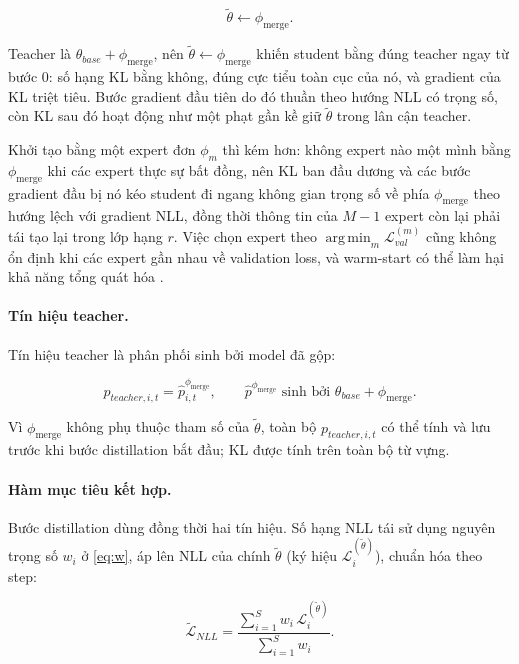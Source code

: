 \documentclass[12pt,a4paper]{article}
\DeclareMathOperator*{\argmin}{arg\,min}
\newcommand{\pmerge}{\phi_{\mathrm{merge}}}
\begin{document}
\begin{equation}
\label{eq:studentinit}
\tilde\theta \leftarrow \pmerge.
\end{equation}

Teacher là $\theta_{base}+\pmerge$, nên $\tilde\theta \leftarrow \pmerge$ khiến student bằng đúng teacher ngay từ bước $0$: số hạng KL bằng không, đúng cực tiểu toàn cục của nó, và gradient của KL triệt tiêu. Bước gradient đầu tiên do đó thuần theo hướng NLL có trọng số, còn KL sau đó hoạt động như một phạt gần kề giữ $\tilde\theta$ trong lân cận teacher.

Khởi tạo bằng một expert đơn $\phi_m$ thì kém hơn: không expert nào một mình bằng $\pmerge$ khi các expert thực sự bất đồng, nên KL ban đầu dương và các bước gradient đầu bị nó kéo student đi ngang không gian trọng số về phía $\pmerge$ theo hướng lệch với gradient NLL, đồng thời thông tin của $M-1$ expert còn lại phải tái tạo lại trong lớp hạng $r$. Việc chọn expert theo $\argmin_m \mathcal{L}_{val}^{(m)}$ cũng không ổn định khi các expert gần nhau về validation loss, và warm-start có thể làm hại khả năng tổng quát hóa \cite{ash2020warmstarting}.

\paragraph{Tín hiệu teacher.}
Tín hiệu teacher là phân phối sinh bởi model đã gộp:

\begin{equation}
\label{eq:pteacher}
p_{teacher,i,t} = \hat{p}_{i,t}^{\pmerge}, \qquad \hat{p}^{\pmerge} \text{ sinh bởi } \theta_{base} + \pmerge.
\end{equation}

Vì $\pmerge$ không phụ thuộc tham số của $\tilde\theta$, toàn bộ $p_{teacher,i,t}$ có thể tính và lưu trước khi bước distillation bắt đầu; KL được tính trên toàn bộ từ vựng.

\paragraph{Hàm mục tiêu kết hợp.}
Bước distillation dùng đồng thời hai tín hiệu. Số hạng NLL tái sử dụng nguyên trọng số $w_i$ ở \eqref{eq:w}, áp lên NLL của chính $\tilde\theta$ (ký hiệu $\mathcal{L}_i^{(\tilde\theta)}$), chuẩn hóa theo step:

\begin{equation}
\label{eq:nllstudent}
\widetilde{\mathcal{L}}_{NLL} = \frac{\sum_{i=1}^{S} w_i\, \mathcal{L}_i^{(\tilde\theta)}}{\sum_{i=1}^{S} w_i}.
\end{equation}
\end{document}
